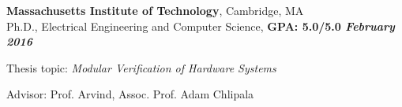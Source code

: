 \documentclass[margin]{resume}
\begin{document}
\begin{resume}
    \textbf{Massachusetts Institute of Technology}, Cambridge, MA \\
    Ph.D., Electrical Engineering and Computer Science, \hfill \textbf{GPA: 5.0/5.0 \textit{February 2016}}\\
    \begin{list2}
        \item Thesis topic: \textit{Modular Verification of Hardware Systems}
        \item Advisor:  Prof. Arvind, Assoc. Prof. Adam Chlipala


\end{list2}
\end{resume}
\end{document}
